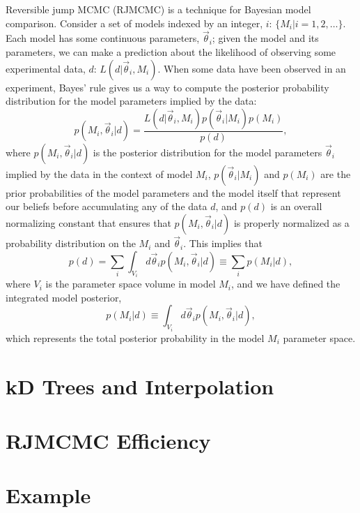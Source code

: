 \documentclass[prd,preprint]{revtex4}
\newcommand{\vtheta}{\vec{\theta}}
\begin{document}
Reversible jump MCMC (RJMCMC) \cite{Green1995} is a technique for
Bayesian model comparison.  Consider a set of models indexed by an
integer, $i$: $\{M_i | i = 1, 2, \ldots \}$.  Each model has some
continuous parameters, $\vtheta_i$; given the model and its
parameters, we can make a prediction about the likelihood of observing
some experimental data, $d$: $L(d|\vtheta_i, M_i)$.  When some data
have been observed in an experiment, Bayes' rule gives us a way to
compute the posterior probability distribution for the model
parameters implied by the data:
\begin{equation}
  p(M_i, \vtheta_i | d) = \frac{L(d|\vtheta_i, M_i) p(\vtheta_i|M_i) p(M_i)}{p(d)},
\end{equation}
where $p(M_i, \vtheta_i |d)$ is the posterior distribution for the
model parameters $\vtheta_i$ implied by the data in the context of
model $M_i$, $p(\vtheta_i|M_i)$ and $p(M_i)$ are the prior
probabilities of the model parameters and the model itself that
represent our beliefs before accumulating any of the data $d$, and
$p(d)$ is an overall normalizing constant that ensures that $p(M_i,
\vtheta_i|d)$ is properly normalized as a probability distribution on
the $M_i$ and $\vtheta_i$.  This implies that 
\begin{equation}
  p(d) = \sum_i \int_{V_i} d\vtheta_i p(M_i, \vtheta_i|d) \equiv
  \sum_i p(M_i|d),
\end{equation}
where $V_i$ is the parameter space volume in model $M_i$, and we have
defined the integrated model posterior, 
\begin{equation}
  p(M_i|d) \equiv \int_{V_i} d\vtheta_i p(M_i, \vtheta_i | d),
\end{equation}
which represents the total posterior probability in the model $M_i$
parameter space.





\section{kD Trees and Interpolation}

\section{RJMCMC Efficiency}

\section{Example}
\end{document}
